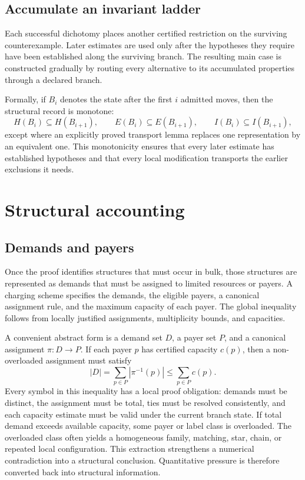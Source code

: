 \documentclass[11pt]{article}
\begin{document}
\subsection{Accumulate an invariant ladder}
Each successful dichotomy places another certified restriction on the surviving counterexample.
Later estimates are used only after the hypotheses they require have been established along the surviving branch.
The resulting main case is constructed gradually by routing every alternative to its accumulated properties through a declared branch.

Formally, if \(B_i\) denotes the state after the first \(i\) admitted moves,
then the structural record is monotone:
\[
  H(B_i)\subseteq H(B_{i+1}),\qquad
  E(B_i)\subseteq E(B_{i+1}),\qquad
  I(B_i)\subseteq I(B_{i+1}),
\]
except where an explicitly proved transport lemma replaces one representation
by an equivalent one. This monotonicity ensures that every later estimate has
established hypotheses and that every local modification transports the
earlier exclusions it needs.
\section{Structural accounting}
\subsection{Demands and payers}
Once the proof identifies structures that must occur in bulk, those structures are represented as demands that must be assigned to limited resources or payers.
A charging scheme specifies the demands, the eligible payers, a canonical assignment rule, and the maximum capacity of each payer.
The global inequality follows from locally justified assignments, multiplicity bounds, and capacities.

A convenient abstract form is a demand set \(D\), a payer set \(P\), and a
canonical assignment \(\pi:D\to P\). If each payer \(p\) has certified
capacity \(c(p)\), then a non-overloaded assignment must satisfy
\[
  |D|=\sum_{p\in P}|\pi^{-1}(p)|
  \leq \sum_{p\in P}c(p).
\]
Every symbol in this inequality has a local proof obligation: demands must be
distinct, the assignment must be total, ties must be resolved consistently,
and each capacity estimate must be valid under the current branch state.
If total demand exceeds available capacity, some payer or label class is overloaded.
The overloaded class often yields a homogeneous family, matching, star, chain, or repeated local configuration. This extraction strengthens a numerical contradiction into a structural conclusion.
Quantitative pressure is therefore converted back into structural information.
\end{document}
